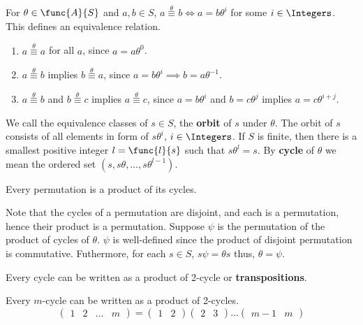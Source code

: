 For \(\theta \in \func{A}{S}\) and \(a,b \in S\), \(a \overset{\theta}{\equiv} b \iff a = b \theta^i\) for some \(i \in \Integers\). This defines an equivalence relation. 

\begin{enumerate}
    \item \(a \overset{\theta}{\equiv} a \) for all \(a\), since \(a = a \theta^0\).
    \item \(a \overset{\theta}{\equiv} b\) implies \(b \overset{\theta}{\equiv} a\), since \(a = b \theta^{i} \implies b = a\theta^{-1}\).
    \item \(a \overset{\theta}{\equiv} b\) and \(b \overset{\theta}{\equiv} c\) implies \(a \overset{\theta}{\equiv} c\), since \(a = b \theta^i\) and \(b = c \theta^j\) implies \(a = c \theta^{i + j}\).
\end{enumerate}

We call the equivalence classes of \(s \in S\), the \textbf{orbit} of \(s\) under \(\theta\). The orbit of \(s\) consists of all elements in form of \(s \theta^i\), \(i \in \Integers\). If \(S\) is finite, then there is a smallest positive integer \(l = \func{l}{s}\) such that \(s\theta^l = s\). By \textbf{cycle} of \(\theta\) we mean the ordered set \((s,s\theta, \dots , s\theta^{l-1})\).

\begin{lemma}
    Every permutation is a product of its cycles.
\end{lemma}

\begin{prooflemma}
    Note that the cycles of a permutation are disjoint, and each is a permutation, hence their product is a permutation. Suppose \(\psi\) is the permutation of the product of cycles of \(\theta\). \(\psi\) is well-defined since the product of disjoint permutation is commutative. Futhermore, for each \(s \in S\), \(s\psi = \theta s\) thus, \(\theta = \psi\).
\end{prooflemma}

\begin{lemma}
    Every cycle can be written as a product of 2-cycle or \textbf{transpositions}.
\end{lemma}

\begin{prooflemma}
    Every \(m\)-cycle can be written as a product of 2-cycles. 
    \begin{equation*}
        \begin{pmatrix*}
            1 & 2& \dots & m
        \end{pmatrix*} = \begin{pmatrix*}
            1 & 2
        \end{pmatrix*}
        \begin{pmatrix*}
            2& 3
        \end{pmatrix*} \dots 
        \begin{pmatrix*}
            m-1& m
        \end{pmatrix*}
    \end{equation*}
\end{prooflemma}

